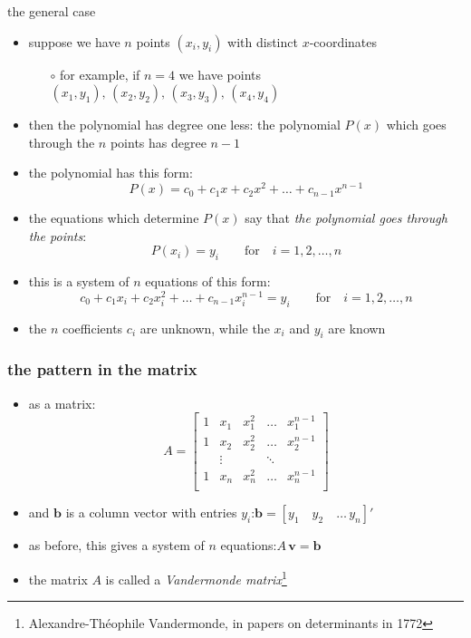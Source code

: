 \documentclass[10pt,hyperref]{beamer}
\newcommand{\bb}{\mathbf{b}}
\newcommand{\bv}{\mathbf{v}}
\begin{document}
\begin{frame}{the general case}

\begin{itemize}
\item suppose we have $n$ points $(x_i,y_i)$ with distinct $x$-coordinates
  \begin{itemize}
  \item[$\circ$]  for example, if $n=4$ we have points $(x_1,y_1),\,(x_2,y_2),\,(x_3,y_3),\,(x_4,y_4)$
  \end{itemize}
\item then the polynomial has degree one less:  the polynomial $P(x)$ which goes through the $n$ points has degree $n-1$
\item the polynomial has this form:
	$$P(x) = c_0 + c_1 x + c_2 x^2 + \dots + c_{n-1} x^{n-1}$$
\item the equations which determine $P(x)$ say that \emph{the polynomial goes through the points}:
	$$P(x_i) = y_i \qquad \text{for} \quad i=1,2,\dots,n$$
\item this is a system of $n$ equations of this form:
	$$c_0 + c_1 x_i + c_2 x_i^2 + \dots + c_{n-1} x_i^{n-1} = y_i \qquad \text{for} \quad i=1,2,\dots,n$$
\item the $n$ coefficients $c_i$ are unknown, while the $x_i$ and $y_i$ are known
\end{itemize}
\end{frame}


\begin{frame}[fragile]
\frametitle{the pattern in the matrix}

\begin{itemize}
\item as a matrix:
	$$A = \begin{bmatrix}
	1 & x_1 & x_1^2 & \dots & x_1^{n-1} \\
	1 & x_2 & x_2^2 & \dots & x_2^{n-1} \\
	 & \vdots & & \ddots &  \\
	1 & x_n & x_n^2 & \dots & x_n^{n-1} \\
	\end{bmatrix}$$
\item and $\bb$ is a column vector with entries $y_i$:\quad  $\bb = [y_1\quad y_2 \quad \dots \, y_n]'$
\item as before, this gives a system of $n$ equations:\quad $A\, \bv = \bb$
\item the matrix $A$ is called a \emph{Vandermonde matrix}\footnote{Alexandre-Th\'eophile Vandermonde, in papers on determinants in 1772}
\end{itemize}
\end{frame}
\end{document}
